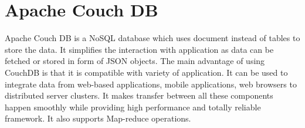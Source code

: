 \section{Apache Couch DB}

Apache Couch DB is a NoSQL database which uses document instead of tables to
store the data. It simplifies the interaction with application as data can be
fetched or stored in form of JSON objects.
The main advantage of using CouchDB is that it is compatible with variety of
application. It can be used to integrate data from web-based applications,
mobile applications, web browsers to distributed server clusters. It makes
transfer between all these components happen smoothly while providing high
performance and totally reliable framework. It also supports Map-reduce
operations.~\cite{hid-sp18-502-ApacheCouchDB}

